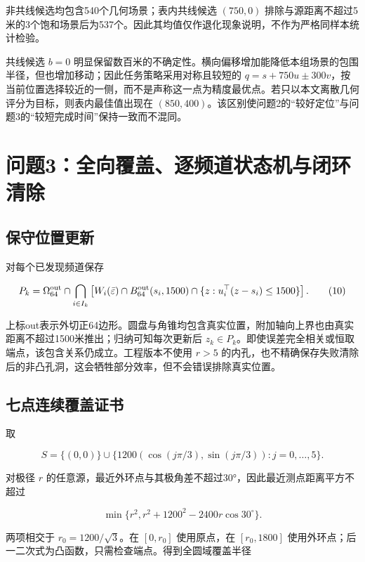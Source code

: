 \documentclass[
  chinese,
  UTF8,
  a4paper,
  zihao=-4]{ctexart}
\begin{document}
非共线候选均包含540个几何场景；表内共线候选 \((750,0)\)
排除与源距离不超过5米的3个饱和场景后为537个。因此其均值仅作退化现象说明，不作为严格同样本统计检验。

共线候选 \(b=0\)
明显保留数百米的不确定性。横向偏移增加能降低本组场景的包围半径，但也增加移动；因此任务策略采用对称且较短的
\(q=s+750u\pm300v\)，按当前位置选择较近的一侧，而不是声称这一点为精度最优点。若只以本文离散几何评分为目标，则表内最佳值出现在
\((850,400)\)。该区别使问题2的``较好定位''与问题3的``较短完成时间''保持一致而不混同。

\section{问题3：全向覆盖、逐频道状态机与闭环清除}\label{ux95eeux98983ux5168ux5411ux8986ux76d6ux9010ux9891ux9053ux72b6ux6001ux673aux4e0eux95edux73afux6e05ux9664}

\subsection{保守位置更新}\label{ux4fddux5b88ux4f4dux7f6eux66f4ux65b0}

对每个已发现频道保存

\[
P_k=\Omega^{\rm out}_{64}\cap\bigcap_{i\in I_k}
\left[W_i(\bar\varepsilon)\cap B_{64}^{\rm out}(s_i,1500)
\cap\{z:u_i^\top(z-s_i)\le1500\}\right]. \tag{10}
\]

上标out表示外切正64边形。圆盘与角锥均包含真实位置，附加轴向上界也由真实距离不超过1500米推出；归纳可知每次更新后
\(z_k\in P_k\)。即使误差完全相关或恒取端点，该包含关系仍成立。工程版本不使用
\(r>5\)
的内孔，也不精确保存失败清除后的非凸孔洞，这会牺牲部分效率，但不会错误排除真实位置。

\subsection{七点连续覆盖证书}\label{ux4e03ux70b9ux8fdeux7eedux8986ux76d6ux8bc1ux4e66}

取

\[S=\{(0,0)\}\cup\{1200(\cos(j\pi/3),\sin(j\pi/3)):j=0,\ldots,5\}. \tag{11}\]

对极径 \(r\)
的任意源，最近外环点与其极角差不超过30°，因此最近测点距离平方不超过

\[\min\{r^2,r^2+1200^2-2400r\cos30^\circ\}.\]

两项相交于 \(r_0=1200/\sqrt3\)。在 \([0,r_0]\) 使用原点，在
\([r_0,1800]\)
使用外环点；后一二次式为凸函数，只需检查端点。得到全圆域覆盖半径
\end{document}
